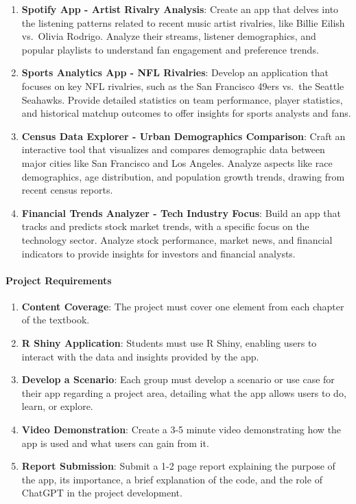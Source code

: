 \documentclass[
  letterpaper,
  DIV=11,
  numbers=noendperiod]{scrartcl}
\let\oldparagraph\paragraph
\renewcommand{\paragraph}[1]{\oldparagraph{#1}\mbox{}}
\providecommand{\tightlist}{%
  \setlength{\itemsep}{0pt}\setlength{\parskip}{0pt}}\usepackage{longtable,booktabs,array}
\begin{document}
\begin{enumerate}
\def\labelenumi{\arabic{enumi}.}
\item
  \textbf{Spotify App - Artist Rivalry Analysis}: Create an app that
  delves into the listening patterns related to recent music artist
  rivalries, like Billie Eilish vs.~Olivia Rodrigo. Analyze their
  streams, listener demographics, and popular playlists to understand
  fan engagement and preference trends.
\item
  \textbf{Sports Analytics App - NFL Rivalries}: Develop an application
  that focuses on key NFL rivalries, such as the San Francisco 49ers
  vs.~the Seattle Seahawks. Provide detailed statistics on team
  performance, player statistics, and historical matchup outcomes to
  offer insights for sports analysts and fans.
\item
  \textbf{Census Data Explorer - Urban Demographics Comparison}: Craft
  an interactive tool that visualizes and compares demographic data
  between major cities like San Francisco and Los Angeles. Analyze
  aspects like race demographics, age distribution, and population
  growth trends, drawing from recent census reports.
\item
  \textbf{Financial Trends Analyzer - Tech Industry Focus}: Build an app
  that tracks and predicts stock market trends, with a specific focus on
  the technology sector. Analyze stock performance, market news, and
  financial indicators to provide insights for investors and financial
  analysts.
\end{enumerate}

\hypertarget{project-requirements}{%
\paragraph{\texorpdfstring{\textbf{Project
Requirements}}{Project Requirements}}\label{project-requirements}}

\begin{enumerate}
\def\labelenumi{\arabic{enumi}.}
\tightlist
\item
  \textbf{Content Coverage}: The project must cover one element from
  each chapter of the textbook.
\item
  \textbf{R Shiny Application}: Students must use R Shiny, enabling
  users to interact with the data and insights provided by the app.
\item
  \textbf{Develop a Scenario}: Each group must develop a scenario or use
  case for their app regarding a project area, detailing what the app
  allows users to do, learn, or explore.
\item
  \textbf{Video Demonstration}: Create a 3-5 minute video demonstrating
  how the app is used and what users can gain from it.
\item
  \textbf{Report Submission}: Submit a 1-2 page report explaining the
  purpose of the app, its importance, a brief explanation of the code,
  and the role of ChatGPT in the project development.
\end{enumerate}
\end{document}
